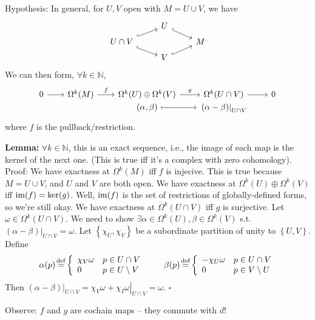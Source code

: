 \documentclass[10pt,letterpaper]{article}
\newcommand{\n}{\hfill\break}
\newcommand{\nn}{\vspace{0.5\baselineskip}\n}
\newcommand{\hangblock}[2]{\par\noindent\settowidth{\hangindent}{\textbf{#1: }}\textbf{#1: }\nolinebreak#2}
\newcommand{\lemma}[1]{\hangblock{Lemma}{#1}}
\newcommand{\proven}{\;$\square$\n}
\newcommand{\ptxt}[1]{\textrm{\textnormal{#1}}}
\newcommand{\set}[1]{\left\{#1\right\}}
\newcommand{\naturals}{\mathbb{N}}
\newcommand{\N}{\naturals}
\newcommand{\cut}{\setminus}
\newcommand{\restr}[2]{\left.#1\right|_{#2}}
\newcommand{\im}{\textrm{\textnormal{im}}}
\newcommand{\st}{s.t.}
\newcommand{\labeledeq}[1]{\overset{\mathclap{\ptxt{#1}}}{=}}
\newcommand{\eqdef}{\labeledeq{def}}
\begin{document}
\par\noindent
Hypothesis: In general, for $U,V$ open with $M=U\cup{}V$, we have
\[
	\begin{tikzcd}[row sep=tiny]
		& U \arrow[dr, hookrightarrow]\\
		U\cap{}V \arrow[ur, hookrightarrow] \arrow[dr, hookrightarrow] & & M\\
		& V \arrow[ur, hookrightarrow]
	\end{tikzcd}
\]
We can then form, $\forall{}k\in\N$,
\[
	\begin{tikzcd}[column sep=20pt]
		0 \arrow[r] & \Omega^{k}(M) \arrow[r,"f"] & \Omega^{k}(U)\oplus\Omega^{k}(V) \arrow[r,"g"] & \Omega^{k}(U\cap{}V) \arrow[r] & 0 \\[-20pt]
		& & (\alpha,\beta) \arrow[r,mapsto] & \restr{(\alpha-\beta)}{U\cap{}V}
	\end{tikzcd}
\]
where $f$ is the pullback/restriction.\n

\lemma{
	$\forall{}k\in\N$, this is an exact sequence, i.e., the image of each map is the kernel of the next one. (This is true iff it's a complex with zero cohomology).\nn
	Proof: We have exactness at $\Omega^{k}(M)$ iff $f$ is injecive. This is true because $M=U\cup{}V$, and $U$ and $V$ are both open.\nn
	We have exactness at $\Omega^{k}(U)\oplus\Omega^{k}(V)$ iff $\im(f)=\ker(g)$. Well, $\im(f)$ is the set of restrictions of globally-defined forms, so we're still okay.\nn
	We have exactness at $\Omega^{k}(U\cap{}V)$ iff $g$ is surjective. Let $\omega\in\Omega^{k}(U\cap{}V)$. We need to show $\exists\alpha\in\Omega^{k}(U),\beta\in\Omega^{k}(V)$ \st{} $\restr{(\alpha-\beta)}{U\cap{}V}=\omega$. Let $\set{\chi_{U},\chi_{V}}$ be a subordinate partition of unity to $\set{U,V}$. Define
	\[
		\alpha(p)\eqdef\left\{\begin{array}{ll}
			\chi_{V}\omega & p\in{}U\cap{}V\\
			0 & p\in{}U\cut{}V
		\end{array}\right.
		\qquad
		\beta(p)\eqdef\left\{\begin{array}{ll}
			-\chi_{U}\omega & p\in{}U\cap{}V\\
			0 & p\in{}V\cut{}U
		\end{array}\right.
	\]
	Then $\restr{(\alpha-\beta)}{U\cap{}V}=\restr{\chi_{V}\omega+\chi_{I}\omega}{U\cap{}V}=\omega$.\nn
	\proven
}

\par\noindent
Observe: $f$ and $g$ are cochain maps -- they commute with $d$!\n
\end{document}
